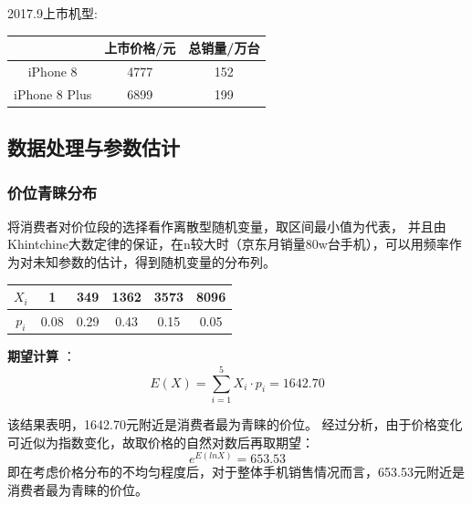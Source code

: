 \documentclass[12pt]{ctexart}
\begin{document}
                2017.9上市机型:
            \begin{center}
                \begin{tabular}{|c|cc|}
                    \hline
                     & 上市价格/元 & 总销量/万台 \\
                    \hline
                    iPhone 8 &4777 &152 \\
                    \hline
                    iPhone 8 Plus &6899 &199\\
                    \hline
                \end{tabular}
            \end{center}

\newpage

\subsection{数据处理与参数估计}

    \subsubsection{价位青睐分布}

        将消费者对价位段的选择看作离散型随机变量，取区间最小值为代表，
        并且由Khintchine大数定律的保证，在n较大时（京东月销量80w台手机），可以用频率作为对未知参数的估计，得到随机变量的分布列。

        \begin{center}
            \begin{tabular}{|c|ccccc|}
                \hline
                $X _i$&1&349&1362&3573&8096\\
                \hline
                $p _i$&0.08&0.29&0.43&0.15&0.05\\
                \hline
            \end{tabular}
        \end{center}    

        \textbf{期望计算} ：
        \begin{equation} %
            E (X)= \sum_{i = 1}^{5} X _i \cdot p _i = 1642.70
        \end{equation} 
        
        该结果表明，1642.70元附近是消费者最为青睐的价位。
        经过分析，由于价格变化可近似为指数变化，故取价格的自然对数后再取期望：
        \begin{equation} %
            e^{E (lnX)} = 653.53
        \end{equation} 
        即在考虑价格分布的不均匀程度后，对于整体手机销售情况而言，653.53元附近是消费者最为青睐的价位。
\end{document}
